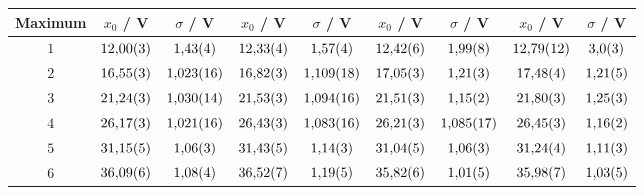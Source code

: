 \begin{table}[htb]
\begin{tabular}{c|cc|cc|cc|cc}
\hline
Maximum & $x_0$ / \unit{\volt} & $\sigma$ / \unit{\volt} & $x_0$ / \unit{\volt} & $\sigma$ / \unit{\volt} & $x_0$ / \unit{\volt} & $\sigma$ / \unit{\volt} & $x_0$ / \unit{\volt} & $\sigma$ / \unit{\volt} \\ 
\hline
$\num{1}$ & $\num{12.00\pm 0.03}$ & $\num{1.43\pm 0.04}$ & $\num{12.33\pm 0.04}$ & $\num{1.57\pm 0.04}$ & $\num{12.42\pm 0.06}$ & $\num{1.99\pm 0.08}$ & $\num{12.79\pm 0.12}$ & $\num{3.0\pm 0.3}$ \\
$\num{2}$ & $\num{16.55\pm 0.03}$ & $\num{1.023\pm 0.016}$ & $\num{16.82\pm 0.03}$ & $\num{1.109\pm 0.018}$ & $\num{17.05\pm 0.03}$ & $\num{1.21\pm 0.03}$ & $\num{17.48\pm 0.04}$ & $\num{1.21\pm 0.05}$ \\
$\num{3}$ & $\num{21.24\pm 0.03}$ & $\num{1.030\pm 0.014}$ & $\num{21.53\pm 0.03}$ & $\num{1.094\pm 0.016}$ & $\num{21.51\pm 0.03}$ & $\num{1.15\pm 0.02}$ & $\num{21.80\pm 0.03}$ & $\num{1.25\pm 0.03}$ \\
$\num{4}$ & $\num{26.17\pm 0.03}$ & $\num{1.021\pm 0.016}$ & $\num{26.43\pm 0.03}$ & $\num{1.083\pm 0.016}$ & $\num{26.21\pm 0.03}$ & $\num{1.085\pm 0.017}$ & $\num{26.45\pm 0.03}$ & $\num{1.16\pm 0.02}$ \\
$\num{5}$ & $\num{31.15\pm 0.05}$ & $\num{1.06\pm 0.03}$ & $\num{31.43\pm 0.05}$ & $\num{1.14\pm 0.03}$ & $\num{31.04\pm 0.05}$ & $\num{1.06\pm 0.03}$ & $\num{31.24\pm 0.04}$ & $\num{1.11\pm 0.03}$ \\
$\num{6}$ & $\num{36.09\pm 0.06}$ & $\num{1.08\pm 0.04}$ & $\num{36.52\pm 0.07}$ & $\num{1.19\pm 0.05}$ & $\num{35.82\pm 0.06}$ & $\num{1.01\pm 0.05}$ & $\num{35.98\pm 0.07}$ & $\num{1.03\pm 0.05}$ \\
\hline\end{tabular}
\label{tab:temperatur}
\end{table}